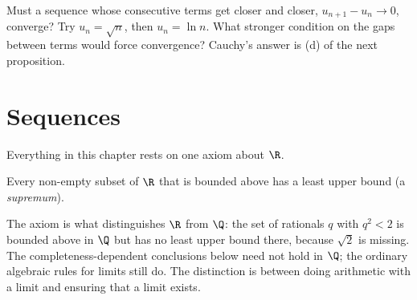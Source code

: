 \begin{think}
Must a sequence whose consecutive terms get closer and closer, $u_{n+1}-u_n\to0$, converge? Try $u_n=\sqrt n$, then $u_n=\ln n$. What stronger condition on the gaps between terms would force convergence? Cauchy's answer is (d) of the next proposition.
\end{think}

\section{Sequences}

Everything in this chapter rests on one axiom about $\R$.

\begin{reminder}[completeness of $\R$]
Every non-empty subset of $\R$ that is bounded above has a least upper bound (a \emph{supremum}).
\end{reminder}

The axiom is what distinguishes $\R$ from $\Q$: the set of rationals $q$ with $q^2<2$ is bounded above in $\Q$ but has no least upper bound there, because
$\sqrt2$ is missing. The completeness-dependent conclusions below need not hold in $\Q$; the ordinary algebraic rules for limits still do. The distinction is between doing arithmetic with a limit and ensuring that a limit exists.

